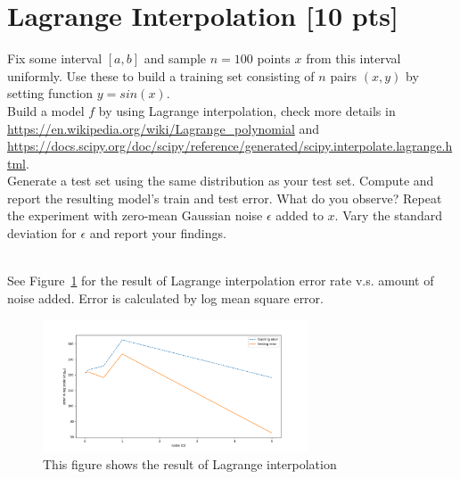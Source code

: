 \documentclass[a4paper]{article}
\theoremstyle{definition}
\newenvironment{soln}{
    \leavevmode\color{blue}\ignorespaces
}{}
\begin{document}
\section{Lagrange Interpolation [10 pts]}
Fix some interval $[a, b]$ and sample $n = 100$ points $x$ from this interval uniformly. Use these to build a training set consisting of $n$ pairs $(x, y)$ by setting function $y = sin(x)$. \\

Build a model $f$ by using Lagrange interpolation, check more details in \url{https://en.wikipedia.org/wiki/Lagrange_polynomial} and \url{https://docs.scipy.org/doc/scipy/reference/generated/scipy.interpolate.lagrange.html}. \\

Generate a test set using the same distribution as your test set. Compute and report the resulting model’s train and test error. What do you observe?
Repeat the experiment with zero-mean Gaussian noise $\epsilon$ added to $x$. Vary the standard deviation for $\epsilon$ and report your findings.
\begin{soln}
  \\See Figure~\ref{fig:lagrange} for the result of Lagrange interpolation error rate v.s. amount of noise added. Error is calculated by log mean square error.
  \begin{figure}
    \centering
    \includegraphics[width=0.7\textwidth]{./data/p4.png}
    \caption{This figure shows the result of Lagrange interpolation}
    \label{fig:lagrange}
  \end{figure}
\end{soln}

\end{document}
